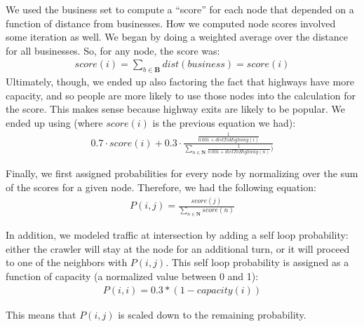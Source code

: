 \documentclass{article}
\begin{document}
We used the business set to compute a ``score'' for each node that depended on a function of distance from businesses. How we computed node scores involved some iteration as well. We began by doing a weighted average over the distance for all businesses. So, for any node, the score was:
\begin{eqnarray*}
	score(i) = \sum\limits_{b \in \mathbf{B}} dist(business) = score(i)
\end{eqnarray*}
Ultimately, though, we ended up also factoring the fact that highways have more capacity, and so people are more likely to use those nodes into the calculation for the score. This makes sense because highway exits are likely to be popular. We ended up using (where $score(i)$ is the previous equation we had):
\begin{eqnarray*}
	0.7 \cdot score(i)+ 0.3 \cdot \frac{\frac{1}{0.001 + distToHighway(i)}}{\sum\limits_{n \in \mathbf{N}} \frac{1}{0.001 + distToHighway(n)})}
\end{eqnarray*}

Finally, we first assigned probabilities for every node by normalizing over the sum of the scores for a given node. Therefore, we had the following equation: \\
\begin{eqnarray*}
	P(i,j) = \frac{score(j)}{\sum\limits_{n \in \mathbf{N}} score(n)}
\end{eqnarray*}

In addition, we modeled traffic at intersection by adding a self loop probability: either the crawler will stay at the node for an additional turn, or it will proceed to one of the neighbors with $P(i, j)$. This self loop probability is assigned as a function of capacity (a normalized value between 0 and 1):
\begin{eqnarray*}
	P(i, i) = 0.3 * (1 - capacity(i))
\end{eqnarray*}

This means that $P(i, j)$ is scaled down to the remaining probability.
\end{document}
